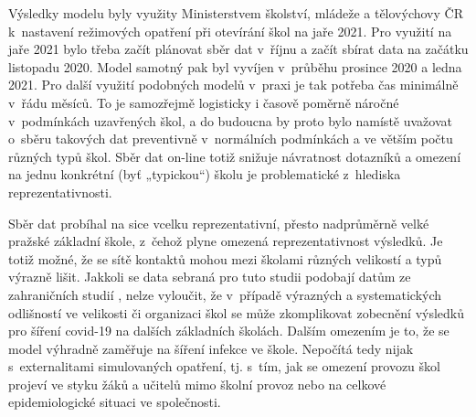 Výsledky modelu byly využity Ministerstvem školství, mládeže a tělovýchovy ČR k~nastavení režimových opatření při otevírání škol na jaře 2021. Pro využití na jaře 2021 bylo třeba začít plánovat sběr dat v~říjnu a začít sbírat data na začátku listopadu 2020. Model samotný pak byl vyvíjen v~průběhu prosince 2020 a ledna 2021. Pro další využití podobných modelů v~praxi je tak potřeba čas minimálně v~řádu měsíců. To je samozřejmě logisticky i časově poměrně náročné v~podmínkách uzavřených škol, a do budoucna by proto bylo namístě uvažovat o~sběru takových dat preventivně v~normálních podmínkách a ve větším počtu různých typů škol. Sběr dat on-line totiž snižuje návratnost dotazníků a omezení na jednu konkrétní (byť „typickou“) školu je problematické z~hlediska reprezentativnosti.

Sběr dat probíhal na sice vcelku reprezentativní, přesto nadprůměrně velké praž\-ské základní škole, z~čehož plyne omezená reprezentativnost výsledků. Je totiž možné, že se sítě kontaktů mohou mezi školami různých velikostí a typů výrazně lišit. Jakkoli se data sebraná pro tuto studii podobají datům ze zahraničních studií \cite{gemmetto2014mitigation, mcgee2021model, stehle2011high}, nelze vyloučit, že v~případě výrazných a systematických odlišností ve velikosti či organizaci škol se může zkomplikovat zobecnění výsledků pro šíření covid-19 na dalších základních školách. Dalším omezením je to, že se model výhradně zaměřuje na šíření infekce ve škole. Nepočítá tedy nijak s~externalitami simulovaných opatření, tj. s~tím, jak se omezení provozu škol projeví ve styku žáků a učitelů mimo školní provoz nebo na celkové epidemiologické situaci ve společnosti.









